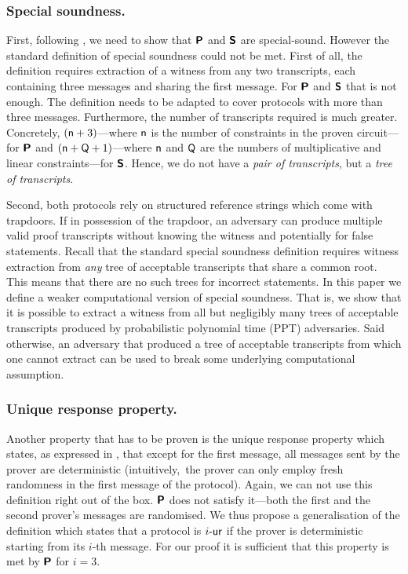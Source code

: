 \documentclass[runningheads,11pt]{llncs}
\begin{document}
\subsubsection{Special soundness.} 
First, following \cite{INDOCRYPT:FKMV12}, we need to show that $\bm{\mathsf{P}}$ and
$\bm{\mathsf{S}}$ are special-sound. However the standard definition of special
soundness could not be met. First of all, the definition requires extraction of
a witness from any two transcripts, each containing three messages and sharing
the first message. For $\bm{\mathsf{P}}$ and $\bm{\mathsf{S}}$ that is not enough. The
definition needs to be adapted to cover protocols with more than
three messages. Furthermore, the number of transcripts required is much
greater. Concretely, $(\mathsf{n} + 3)$---where $\mathsf{n}$ is the
number of constraints in the proven circuit---for $\bm{\mathsf{P}}$ and $(\mathsf{n}
+ \mathsf{Q} + 1)$---where $\mathsf{n}$ and $\mathsf{Q}$ are the numbers of
multiplicative and linear constraints---for $\bm{\mathsf{S}}$. Hence, we do not have
a \emph{pair of transcripts}, but a \emph{tree of transcripts}.

Second, both protocols rely on structured reference strings which come with
trapdoors. If in possession of the trapdoor, an adversary can produce multiple valid
proof transcripts without knowing the witness and potentially for false statements. Recall that the
standard special soundness definition requires witness extraction from
\emph{any} tree of acceptable transcripts that share a common root. This means that there are no such trees for incorrect statements. In this paper we
define a weaker computational version of special soundness. That is, we show that it is possible to extract a witness from all
but negligibly many trees of acceptable transcripts produced by probabilistic
polynomial time (PPT) adversaries. Said otherwise, an adversary that produced a
tree of acceptable transcripts from which one cannot extract can be used to
break some underlying computational assumption.

\subsubsection{Unique response property.} Another property that has to be proven
is the unique response property which states, as expressed in
\cite{C:Fischlin05}, that except for the first message, all messages sent by the
prover are deterministic (intuitively,~the prover can only employ fresh
randomness in the first message of the protocol). Again, we can not use this
definition right out of the box. $\bm{\mathsf{P}}$ does not satisfy it---both the
first and the second prover's messages are randomised. We thus propose a
generalisation of the definition which states that a protocol is ${i\text{-}\mathsf{ur}}$ if the
prover is deterministic starting from its $i$-th message. For our proof it is
sufficient that this property is met by $\bm{\mathsf{P}}$ for $i = 3$. 
\end{document}

